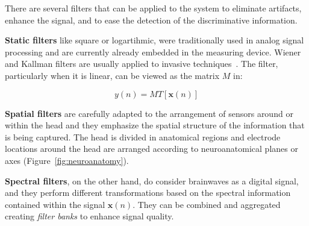 There are several filters that can be applied to the system to eliminate artifacts, enhance the signal, and to ease the detection of the discriminative information.

\textbf{Static filters} like square or logartihmic, were traditionally used in analog signal processing and are currently already embedded in the measuring device.  Wiener and Kallman filters are usually applied to invasive techniques~\cite{He2013}.  The filter, particularly when it is linear, can be viewed as the matrix $M$ in:

\begin{equation}
y(n) = M T\left[\mathbf{x}(n)\right]
\label{eq:filters}
\end{equation}

\textbf{Spatial filters} are carefully adapted to the arrangement of sensors around or within the head and they emphasize the spatial structure of the information that is being captured. The head is divided in anatomical regions and electrode locations around the head are arranged according to neuroanatomical planes or axes (Figure~\ref{fig:neuroanatomy}).

\textbf{Spectral filters}, on the other hand, do consider brainwaves as a digital signal, and they perform different transformations based on the spectral information contained within the signal $\mathbf{x}(n)$.  They can be combined and aggregated creating  \textit{filter banks} to enhance signal quality. 


